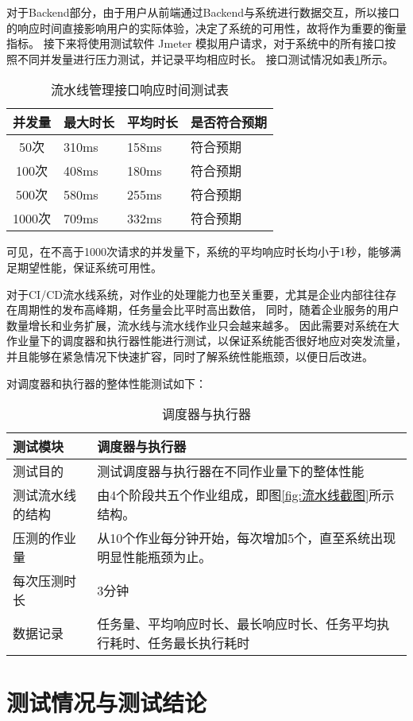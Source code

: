 对于Backend部分，由于用户从前端通过Backend与系统进行数据交互，所以接口的响应时间直接影响用户的实际体验，决定了系统的可用性，故将作为重要的衡量指标。
接下来将使用测试软件 Jmeter 模拟用户请求，对于系统中的所有接口按照不同并发量进行压力测试，并记录平均相应时长。
接口测试情况如表\ref{tab:流水线管理接口响应时间测试表}所示。

\begin{table}[h]
  \centering
  \caption{流水线管理接口响应时间测试表}
  \label{tab:流水线管理接口响应时间测试表}
  \begin{tabular}{clll}
    \toprule
    并发量         & 最大时长            & 平均时长     & 是否符合预期                       \\
    \midrule
    50次         & 310ms              & 158ms     & 符合预期                 \\
    100次        & 408ms              & 180ms     & 符合预期                 \\
    500次        & 580ms              & 255ms     & 符合预期                     \\
    1000次       & 709ms              & 332ms     & 符合预期                     \\
    \bottomrule
  \end{tabular}
\end{table}

可见，在不高于1000次请求的并发量下，系统的平均响应时长均小于1秒，能够满足期望性能，保证系统可用性。

对于CI/CD流水线系统，对作业的处理能力也至关重要，尤其是企业内部往往存在周期性的发布高峰期，任务量会比平时高出数倍，
同时，随着企业服务的用户数量增长和业务扩展，流水线与流水线作业只会越来越多。
因此需要对系统在大作业量下的调度器和执行器性能进行测试，以保证系统能否很好地应对突发流量，并且能够在紧急情况下快速扩容，同时了解系统性能瓶颈，以便日后改进。

对调度器和执行器的整体性能测试如下：

\begin{table}[ht]
  \centering
  \caption{调度器与执行器}
  \label{tab:调度器与执行器性能测试计划表}
  \begin{tabular}{|p{2cm}|p{10cm}|}
  \hline
  测试模块 & 调度器与执行器 \\ \hline
  测试目的 & 测试调度器与执行器在不同作业量下的整体性能 \\ \hline
  测试流水线的结构 & 由4个阶段共五个作业组成，即图\ref{fig:流水线截图}所示结构。\\ \hline
  压测的作业量 & 从10个作业每分钟开始，每次增加5个，直至系统出现明显性能瓶颈为止。\\ \hline
  每次压测时长 & 3分钟\\ \hline
  数据记录 & 任务量、平均响应时长、最长响应时长、任务平均执行耗时、任务最长执行耗时\\ \hline
  \end{tabular}
\end{table}

\section{测试情况与测试结论}

